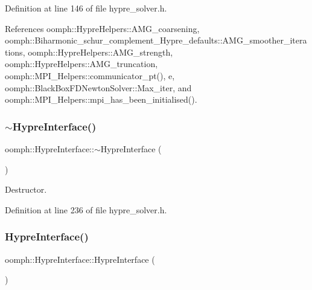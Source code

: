 Definition at line 146 of file hypre\+\_\+solver.\+h.



References oomph\+::\+Hypre\+Helpers\+::\+A\+M\+G\+\_\+coarsening, oomph\+::\+Biharmonic\+\_\+schur\+\_\+complement\+\_\+\+Hypre\+\_\+defaults\+::\+A\+M\+G\+\_\+smoother\+\_\+iterations, oomph\+::\+Hypre\+Helpers\+::\+A\+M\+G\+\_\+strength, oomph\+::\+Hypre\+Helpers\+::\+A\+M\+G\+\_\+truncation, oomph\+::\+M\+P\+I\+\_\+\+Helpers\+::communicator\+\_\+pt(), e, oomph\+::\+Black\+Box\+F\+D\+Newton\+Solver\+::\+Max\+\_\+iter, and oomph\+::\+M\+P\+I\+\_\+\+Helpers\+::mpi\+\_\+has\+\_\+been\+\_\+initialised().

\mbox{\label{classoomph_1_1HypreInterface_a713e74ad0f84ae06be5c7daa87337ecf}} 
\subsubsection{\texorpdfstring{$\sim$\+Hypre\+Interface()}{~HypreInterface()}}
{\footnotesize\ttfamily oomph\+::\+Hypre\+Interface\+::$\sim$\+Hypre\+Interface (\begin{DoxyParamCaption}{ }\end{DoxyParamCaption})\hspace{0.3cm}{\ttfamily [inline]}}



Destructor. 



Definition at line 236 of file hypre\+\_\+solver.\+h.

\mbox{\label{classoomph_1_1HypreInterface_acd08f9cc3fc431619cb00ba3aff9af94}} 
\subsubsection{\texorpdfstring{Hypre\+Interface()}{HypreInterface()}\hspace{0.1cm}{\footnotesize\ttfamily [2/2]}}
{\footnotesize\ttfamily oomph\+::\+Hypre\+Interface\+::\+Hypre\+Interface (\begin{DoxyParamCaption}\item[{const \hyperlink{classoomph_1_1HypreInterface}{Hypre\+Interface} \&}]{ }\end{DoxyParamCaption})\hspace{0.3cm}{\ttfamily [inline]}}



